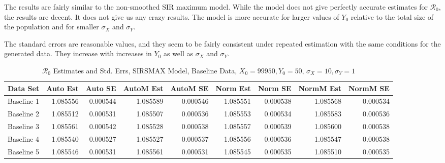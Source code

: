 \documentclass[12pt]{article}
\newcommand{\rr}{\ensuremath{\mathcal{R}_0}}
\begin{document}
The results are fairly similar to the non-smoothed SIR maximum model.  While the model does not give perfectly accurate estimates for $\rr$, the results are decent. It does not give us any crazy results. The model is more accurate for larger values of $Y_0$ relative to the total size of the population and for smaller $\sigma_X$ and $\sigma_Y$.

The standard errors are reasonable values, and they seem to be fairly consistent under repeated estimation with the same conditions for the generated data.  They increase with increases in $Y_0$ as well as $\sigma_X$ and $\sigma_Y$.

\begin{table}[H]
	
	\caption{$\rr$ Estimates and Std. Errs, SIRSMAX Model,
		Baseline Data, $X_0 = 99950, Y_0 = 50$, 
		$\sigma_X = 10, \sigma_Y = 1$}
	\begin{footnotesize}
		\hskip -1cm
		\begin{tabular}{l|r|r|r|r|r|r|r|r}
			\hline
			Data Set & Auto Est & Auto SE & AutoM Est & AutoM SE & Norm Est & Norm SE & NormM Est & NormM SE\\
			\hline
			Baseline 1 & 1.085556 & 0.000544 & 1.085589 & 0.000546 & 1.085551 & 0.000538 & 1.085568 & 0.000534\\
			\hline
			Baseline 2 & 1.085512 & 0.000531 & 1.085507 & 0.000536 & 1.085553 & 0.000534 & 1.085583 & 0.000536\\
			\hline
			Baseline 3 & 1.085561 & 0.000542 & 1.085528 & 0.000538 & 1.085557 & 0.000539 & 1.085600 & 0.000538\\
			\hline
			Baseline 4 & 1.085540 & 0.000527 & 1.085527 & 0.000537 & 1.085556 & 0.000536 & 1.085547 & 0.000538\\
			\hline
			Baseline 5 & 1.085546 & 0.000531 & 1.085561 & 0.000531 & 1.085545 & 0.000535 & 1.085510 & 0.000535\\
			\hline
		\end{tabular}
	\end{footnotesize}
\end{table}
\end{document}
